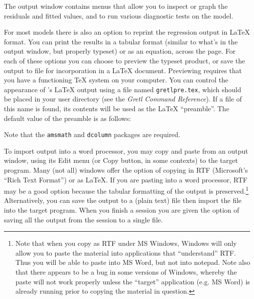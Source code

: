 The output window contains menus that allow you to inspect or graph
the residuals and fitted values, and to run various diagnostic tests
on the model. 

For most models there is also an option to reprint the regression
output in {\LaTeX} format.  You can print the results in a tabular
format (similar to what's in the output window, but properly typeset)
or as an equation, across the page.  For each of these options you can
choose to preview the typeset product, or save the output to file for
incorporation in a {\LaTeX} document.  Previewing requires that you
have a functioning {\TeX} system on your computer.  You can control
the appearance of 's {\LaTeX} output using a file named
\verb+gretlpre.tex+, which should be placed in your  user
directory (see the \emph{Gretl Command Reference}).  If a file of this
name is found, its contents will be used as the {\LaTeX} ``preamble''.
The default value of the preamble is as follows:
    

Note that the \verb+amsmath+
 and \verb+dcolumn+ packages are required.

To import  output
 into a word processor, you may copy and paste from an output window,
 using its \textsf{Edit} menu (or Copy button, in some contexts) to
 the target program.  Many (not all)  windows offer the
 option of copying in RTF (Microsoft's ``Rich Text Format'') or as
 {\LaTeX}. If you are pasting into a word processor, RTF may be a good
 option because the tabular formatting of the output is
 preserved.\footnote{Note that when you copy as RTF under MS Windows,
 Windows will only allow you to paste the material into applications
 that ``understand'' RTF.  Thus you will be able to paste into MS
 Word, but not into notepad.  Note also that there appears to be a bug
 in some versions of Windows, whereby the paste will not work properly
 unless the ``target'' application (e.g.  MS Word) is already running
 prior to copying the material in question.}  Alternatively, you can
 save the output to a (plain text) file then import the file into the
 target program.  When you finish a  session you are given
 the option of saving all the output from the session to a single
 file.

